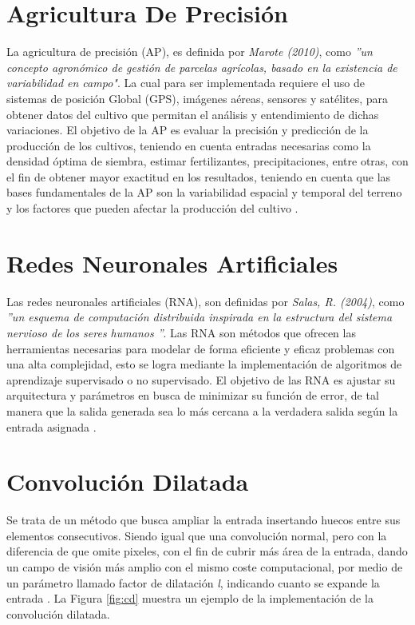 \section{Agricultura De Precisión} La agricultura de precisión (AP), es definida por \textit{Marote (2010)}, como \textit{''un concepto agronómico de gestión de parcelas agrícolas, basado en la existencia de variabilidad en campo"}. La cual para ser implementada requiere el uso de sistemas de posición Global (GPS), imágenes aéreas, sensores y satélites, para obtener datos del cultivo que permitan el análisis y entendimiento de dichas variaciones. El objetivo de la AP es evaluar la precisión y predicción de la producción de los cultivos, teniendo en cuenta entradas necesarias como la densidad óptima de siembra, estimar fertilizantes, precipitaciones, entre otras, con el fin de obtener mayor exactitud en los resultados, teniendo en cuenta que las bases fundamentales de la AP son la variabilidad espacial y temporal del terreno y los factores que pueden afectar la producción del cultivo \cite{agricultura}. 


\section{Redes Neuronales Artificiales} Las redes neuronales artificiales (RNA), son definidas por \textit{Salas, R. (2004)}, como \textit{''un esquema de computación distribuida inspirada en la	estructura del sistema nervioso de los seres humanos ''}. Las RNA son métodos que ofrecen las herramientas necesarias para modelar de forma eficiente y eficaz problemas con una alta complejidad, esto se logra mediante la implementación de algoritmos de aprendizaje supervisado o no supervisado. El objetivo de las RNA es ajustar su arquitectura y parámetros en busca de minimizar su función de error, de tal manera que la salida generada sea lo más cercana a la verdadera salida según la entrada asignada \cite{redes}.

\section{Convolución Dilatada}

Se trata de un método que busca ampliar la entrada insertando huecos entre sus elementos consecutivos. Siendo igual que una convolución normal, pero con la diferencia de que omite pixeles, con el fin de cubrir más área de la entrada, dando un campo de visión más amplio con el mismo coste computacional, por medio de un parámetro llamado factor de dilatación \textit{l}, indicando cuanto se expande la entrada \cite{wu2019fastfcn}. La Figura \ref{fig:cd} muestra un ejemplo de la implementación de la convolución dilatada.

